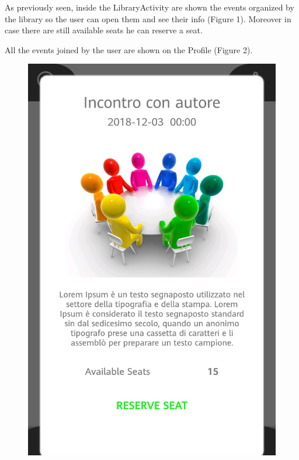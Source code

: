 \newpage
{}
As previously seen, inside the LibraryActivity are shown the events organized by the library so the user can open them and see their info (Figure 1). Moreover in case there are still available seats he can reserve a seat.\par
All the events joined by the user are shown on the Profile (Figure 2).
\begin{figure}[H]
	\centering
	\includegraphics[scale=0.15]{Images/UI/Events/1}
	\hspace{0.5cm}

\end{figure}
